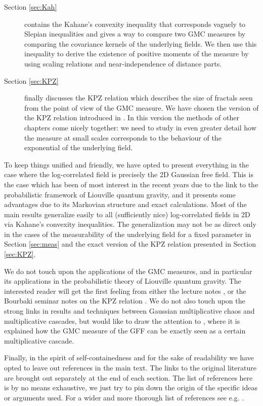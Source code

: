 \documentclass[11pt]{amsart}
\renewcommand{\1}{\mathbf 1}
\begin{document}
\begin{description}
\item [Section \ref{sec:Kah}] contains the Kahane's convexity inequality that corresponds vaguely to Slepian inequalities and gives a way to compare two GMC measures by comparing the covariance kernels of the underlying fields. We then use this inequality to derive the existence of positive moments of the measure by using scaling relations and near-independence of distance parts. 
\item [Section \ref{sec:KPZ}] finally discusses the KPZ relation which describes the size of fractals seen from the point of view of the GMC measure. We have chosen the version of the KPZ relation introduced in \cite{DS}. In this version the methods of other chapters come nicely together: we need to study in even greater detail how the measure at small scales corresponds to the behaviour of the exponential of the underlying field.
\end{description}
To keep things unified and friendly, we have opted to present everything in the case where the log-correlated field is precisely the 2D Gaussian free field. This is the case which has been of most interest in the recent years due to the link to the probabilistic framework of Liouville quantum gravity, and it presents some advantages due to its Markovian structure and exact calculations. Most of the main results generalize easily to all (sufficiently nice) log-correlated fields in 2D via Kahane's convexity inequalities. The generalization may not be as direct only in the cases of the measurability of the underlying field for a fixed parameter in Section \ref{sec:meas} and the exact version of the KPZ relation presented in Section \ref{sec:KPZ}.

We do not touch upon the applications of the GMC measures, and in particular its applications in the probabilistic theory of Liouville quantum gravity. The interested reader will get the first feeling from either the lecture notes \cite{Berln, RVln}, or the Bourbaki seminar notes on the KPZ relation \cite{Gar}. We do not also touch upon the strong links in results and techniques between Gaussian multiplicative chaos and multiplicative cascades, but would like to draw the attention to \cite{APS}, where it is explained how the GMC measure of the GFF can be exactly seen as a certain multiplicative cascade.
 
Finally, in the spirit of self-containedness and for the sake of readability we have opted to leave out references in the main text. The links to the original literature are brought out separately at the end of each section. The list of references here is by no means exhaustive, we just try to pin down the origin of the specific ideas or arguments used. For a wider and more thorough list of references see e.g. \cite{RVrev, DMS}.
\end{document}
